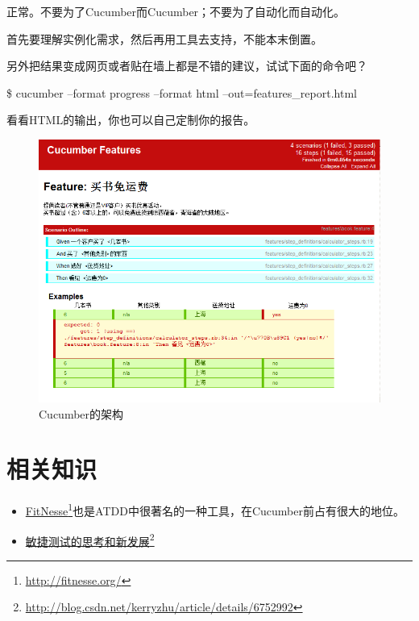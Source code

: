 正常。不要为了Cucumber而Cucumber；不要为了自动化而自动化。

首先要理解实例化需求，然后再用工具去支持，不能本末倒置。

另外把结果变成网页或者贴在墙上都是不错的建议，试试下面的命令吧？

\$ cucumber --format progress --format html --out=features\_report.html

看看HTML的输出，你也可以自己定制你的报告。

\begin{figure}[htbp]
\centering
\includegraphics[keepaspectratio,width=\textwidth,height=0.75\textheight]{img/18333fig0603-tn.png}
\caption{Cucumber的架构}
\end{figure}

\section{相关知识}
\label{相关知识}

\begin{itemize}
\item \href{http://fitnesse.org/}{FitNesse}\footnote{\href{http://fitnesse.org/}{http:/\slash fitnesse.org\slash }}也是ATDD中很著名的一种工具，在Cucumber前占有很大的地位。

\item \href{http://blog.csdn.net/kerryzhu/article/details/6752992}{敏捷测试的思考和新发展}\footnote{\href{http://blog.csdn.net/kerryzhu/article/details/6752992}{http:/\slash blog.csdn.net\slash kerryzhu\slash article\slash details\slash 6752992}}

\end{itemize}

